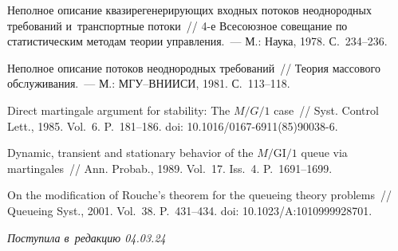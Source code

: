 \begin{multicols}{2}
{{\begin{thebibliography}{99}
 Неполное описание квазирегенерирующих входных потоков 
неоднородных требований и~транспортные потоки~// 4-е Всесоюзное совещание по статистическим
    методам тео\-рии управ\-ле\-ния.~--- М.: Наука, 1978. С.~234--236.
    
 Неполное описание потоков неоднородных требований~//
     Теория  массового обслуживания.~--- М.: МГУ--ВНИИСИ, 1981. С.~113--118.
     
    
    {Direct martingale argument for stability: The $M/G/1$ case}~//
    Syst. Control Lett., 1985. Vol.~6. P.~181--186. doi: 10.1016/0167-6911(85)90038-6.
    
  {Dynamic, transient and stationary behavior of the $M/\mathrm{GI}/1$ queue via 
martingales}~//
   Ann. Probab., 1989. Vol.~17. Iss.~4. P.~1691--1699.
  
 On the modification of Rouche's theorem for the queueing
  theory problems~// Queueing Syst., 2001. Vol.~38. P.~431--434. doi: 10.1023/A:1010999928701.
  
  \end{thebibliography}

 }
 }

\end{multicols}

\vspace*{-9pt}

\hfill{\small\textit{Поступила в~редакцию 04.03.24}}



\newpage

\vspace*{-28pt}




\vspace*{-2pt}


\def\tit{TOWARDS A DEFINITION OF~A~BUSY PERIOD\\ UNDER~NONLOCAL DESCRIPTION OF~INPUT FLOWS}


\def\titkol{Towards a definition of~a~busy period under~nonlocal description of~input flows}


